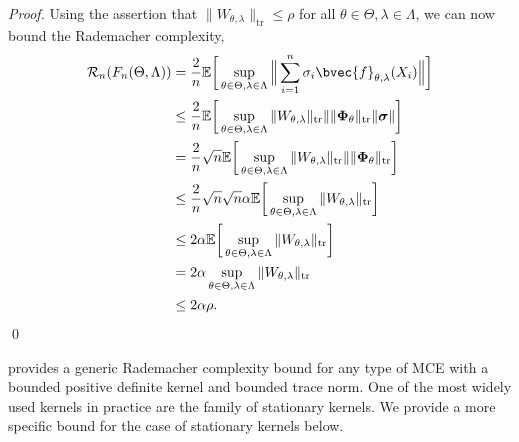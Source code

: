 \documentclass[runningheads, envcountsame, a4paper]{llncs}
\begin{document}
\begin{proof}
				Using the assertion that $\| W_{\theta, \lambda} \|_{\mathrm{tr}} \leq \rho$ for all $\theta \in \Theta, \lambda \in \Lambda$, we can now bound the Rademacher complexity,
				\begin{equation}
				\begin{aligned}
					\mathcal{R}_{n}(F_{n}(\Theta, \Lambda)) &= \frac{2}{n} \mathbb{E}\bigg[\sup_{\theta \in \Theta, \lambda \in \Lambda} \Big\| \sum_{i = 1}^{n} \sigma_{i}\bvec{f}_{\theta, \lambda}(X_{i}) \Big\|\bigg] \\
					&\leq \frac{2}{n} \mathbb{E}\bigg[\sup_{\theta \in \Theta, \lambda \in \Lambda} \|  W_{\theta, \lambda} \|_{\mathrm{tr}} \| \| \bm{\Phi}_{\theta} \|_{\mathrm{tr}} \| \bm{\sigma} \| \bigg] \\
					&= \frac{2}{n} \sqrt{n} \mathbb{E}\bigg[\sup_{\theta \in \Theta, \lambda \in \Lambda} \|  W_{\theta, \lambda} \|_{\mathrm{tr}} \| \| \bm{\Phi}_{\theta} \|_{\mathrm{tr}} \bigg] \\
					&\leq \frac{2}{n} \sqrt{n} \sqrt{n} \alpha \mathbb{E}\bigg[\sup_{\theta \in \Theta, \lambda \in \Lambda} \|  W_{\theta, \lambda} \|_{\mathrm{tr}} \bigg] \\
					&\leq 2 \alpha \mathbb{E}\bigg[\sup_{\theta \in \Theta, \lambda \in \Lambda} \|  W_{\theta, \lambda} \|_{\mathrm{tr}} \bigg] \\
					&= 2 \alpha \sup_{\theta \in \Theta, \lambda \in \Lambda} \|  W_{\theta, \lambda} \|_{\mathrm{tr}} \\
					&\leq 2 \alpha \rho.
				\end{aligned}
				\end{equation}
				\qed
			\end{proof}
	
			 provides a generic Rademacher complexity bound for any type of \gls{MCE} with a bounded positive definite kernel and bounded trace norm. One of the most widely used kernels in practice are the family of stationary kernels. We provide a more specific bound for the case of stationary kernels below.
			
\end{document}
